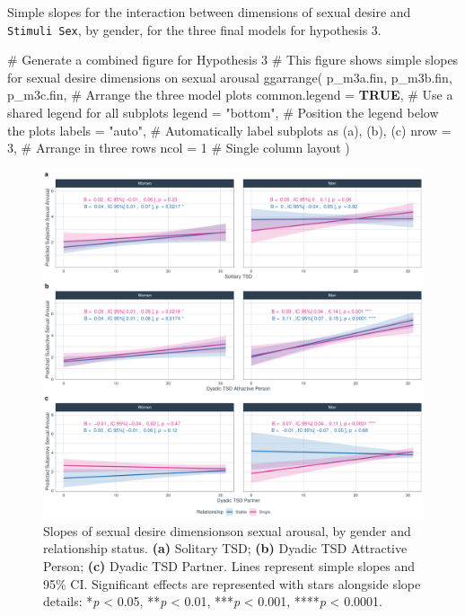 \documentclass[
  bookmarksnumbered]{article}
\newenvironment{Shaded}{\begin{snugshade}}{\end{snugshade}}
\newcommand{\AttributeTok}[1]{\textcolor[rgb]{0.80,0.80,0.80}{#1}}
\newcommand{\CommentTok}[1]{\textcolor[rgb]{0.50,0.62,0.50}{#1}}
\newcommand{\ConstantTok}[1]{\textcolor[rgb]{0.86,0.64,0.64}{\textbf{#1}}}
\newcommand{\DecValTok}[1]{\textcolor[rgb]{0.86,0.86,0.80}{#1}}
\newcommand{\FunctionTok}[1]{\textcolor[rgb]{0.94,0.94,0.56}{#1}}
\newcommand{\NormalTok}[1]{\textcolor[rgb]{0.80,0.80,0.80}{#1}}
\newcommand{\StringTok}[1]{\textcolor[rgb]{0.80,0.58,0.58}{#1}}
\begin{document}
Simple slopes for the interaction between dimensions of sexual desire and \texttt{Stimuli\ Sex}, by gender, for the three final models for hypothesis 3.

\begin{Shaded}
\begin{Highlighting}[]
\CommentTok{\# Generate a combined figure for Hypothesis 3}
\CommentTok{\# This figure shows simple slopes for sexual desire dimensions on sexual arousal}
\FunctionTok{ggarrange}\NormalTok{(}
\NormalTok{  p\_m3a.fin, p\_m3b.fin, p\_m3c.fin, }\CommentTok{\# Arrange the three model plots}
  \AttributeTok{common.legend =} \ConstantTok{TRUE}\NormalTok{, }\CommentTok{\# Use a shared legend for all subplots}
  \AttributeTok{legend =} \StringTok{"bottom"}\NormalTok{, }\CommentTok{\# Position the legend below the plots}
  \AttributeTok{labels =} \StringTok{"auto"}\NormalTok{, }\CommentTok{\# Automatically label subplots as (a), (b), (c)}
  \AttributeTok{nrow =} \DecValTok{3}\NormalTok{, }\CommentTok{\# Arrange in three rows}
  \AttributeTok{ncol =} \DecValTok{1} \CommentTok{\# Single column layout}
\NormalTok{)}
\end{Highlighting}
\end{Shaded}

\begin{figure}
\centering
\includegraphics{Sexual_Desire_Arousal_files/figure-latex/fig-m3-fin-1.pdf}
\caption{\label{fig:fig-m3-fin}Slopes of sexual desire dimensionson sexual arousal, by gender and relationship status. \textbf{(a)} Solitary TSD; \textbf{(b)} Dyadic TSD Attractive Person; \textbf{(c)} Dyadic TSD Partner. Lines represent simple slopes and 95\% CI. Significant effects are represented with stars alongside slope details: *\emph{p} \textless{} 0.05, **\emph{p} \textless{} 0.01, ***\emph{p} \textless{} 0.001, ****\emph{p} \textless{} 0.0001.}
\end{figure}
\end{document}
